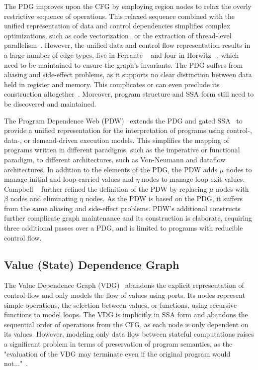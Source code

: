 The PDG improves upon the CFG by employing region nodes to relax the overly restrictive sequence
of operations. This relaxed sequence combined with the unified representation of data and control
dependencies simplifies complex optimizations, such as code vectorization~\cite{Baxter89} or the
extraction of thread-level parallelism~\cite{Ottoni05,Sarkar91}. However, the unified data and
control flow representation results in a large number of edge types, five in Ferrante
\etal~\cite{Ferrante87} and four in Horwitz \etal~\cite{Horwitz288}, which need to be maintained
to ensure the graph's invariants. The PDG suffers from aliasing and side-effect problems, as it
supports no clear distinction between data held in register and memory. This complicates or can
even preclude its construction altogether~\cite{Johnson04}. Moreover, program structure and SSA
form still need to be discovered and maintained.

The Program Dependence Web (PDW)~\cite{Ottenstein90} extends the PDG and gated SSA~\cite{Tu95}
to provide a unified representation for the interpretation of programs using control-, data-, or
demand-driven execution models. This simplifies the mapping of programs written in different
paradigms, such as the imperative or functional paradigm, to different architectures, such as
Von-Neumann and dataflow architectures. In addition to the elements of the PDG, the PDW adds $\mu$
nodes to manage initial and loop-carried values and $\eta$ nodes to manage loop-exit
values. Campbell \etal~\cite{Campbell93} further refined the definition of the PDW by replacing
$\mu$ nodes with $\beta$ nodes and eliminating $\eta$ nodes. As the PDW is based on the PDG, it
suffers from the same aliasing and side-effect problems. PDW's additional constructs
further complicate graph maintenance and its construction is elaborate, requiring three
additional passes over a PDG, and is limited to programs with reducible control flow.



\subsection{Value (State) Dependence Graph}
The Value Dependence Graph (VDG)~\cite{Weise94} abandons the explicit representation of control
flow and only models the flow of values using ports. Its nodes represent simple operations, the
selection between values, or functions, using recursive functions to model loops.
The VDG is implicitly in SSA form and abandons the sequential order of operations from the CFG, as
each node is only dependent on its values. However, modeling only data flow between stateful
computations raises a significant problem in terms of preservation of program semantics, as the
"evaluation of the VDG may terminate even if the original program would not..."~\cite{Weise94}.


